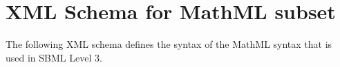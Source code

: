 
\section{XML Schema for MathML subset}
\label{apdx:mathml-subset-schema}

The following XML schema defines the syntax of the MathML syntax
that is used in SBML Level 3.

\tightspacing
\begin{alltt}
\begin{footnotesize}

\end{footnotesize}
\end{alltt}
\regularspacing
